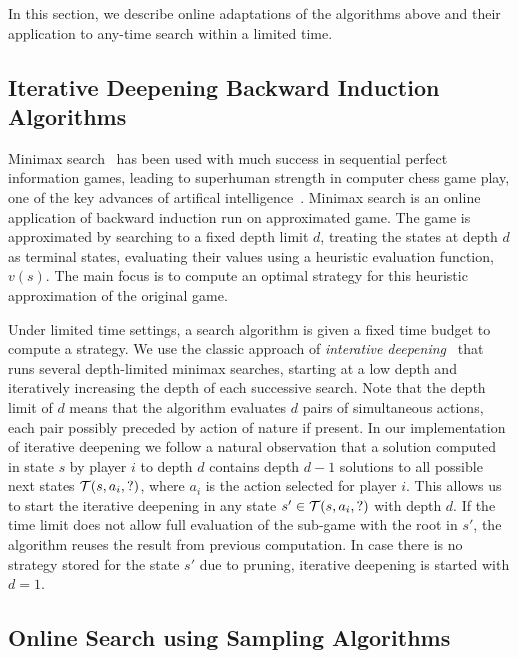 In this section, we describe online adaptations of the algorithms above and their application 
to any-time search within a limited time. 

\subsection{Iterative Deepening Backward Induction Algorithms} \label{sec:idbi}

Minimax search~\cite{AIbook} has been used with much success in sequential perfect information games, 
leading to superhuman strength in computer chess game play, one of the key advances of artifical 
intelligence~\cite{Campbell02deepblue}. 
Minimax search is an online application of backward induction run on approximated game. 
The game is approximated by searching to a fixed depth limit $d$, treating the states at depth $d$
as terminal states, evaluating their values using a heuristic evaluation function, $v(s)$. 
The main focus is to compute an optimal strategy for this heuristic approximation of the original game. 

Under limited time settings, a search algorithm is given a fixed time budget to compute a strategy. 
We use the classic approach of {\it interative deepening}~\cite{AIbook} that runs several depth-limited 
minimax searches, starting at a low depth and iteratively increasing the depth of each successive search. 
Note that the depth limit of $d$ means that the algorithm evaluates $d$ pairs of simultaneous actions, each pair possibly preceded by action of nature if present.  
In our implementation of iterative deepening we follow a natural observation that a solution computed in state $s$ by player $i$ to depth $d$ contains depth $d-1$ solutions to all possible next states $\mathcal{T}(s,a_i,?)$, where $a_i$ is the action selected for player $i$.
This allows us to start the iterative deepening in any state $s' \in \mathcal{T}(s,a_i,?)$ with depth $d$.
If the time limit does not allow full evaluation of the sub-game with the root in $s'$, the algorithm reuses the result from previous computation.
In case there is no strategy stored for the state $s'$ due to pruning, iterative deepening is started with $d = 1$.

\subsection{Online Search using Sampling Algorithms}

